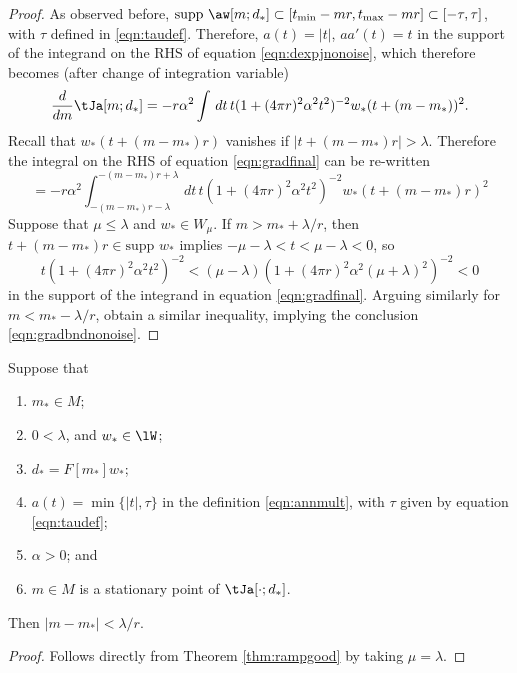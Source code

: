 \begin{proof}
  As observed before, $\mbox{supp }\aw[m;d_*] \subset [t_{\rm
    min}-mr,t_{\rm max}-mr]\subset [-\tau,\tau]$, with $\tau$ defined
  in \ref{eqn:taudef}. Therefore, $a(t) = |t|$, $a a'(t) = t$ in the
  support of the integrand on the RHS of equation
  \ref{eqn:dexpjnonoise}, which therefore 
  becomes (after change of integration variable)
  \begin{equation}
    \label{eqn:gradfinal}
    \frac{d}{dm}\tJa[m;d_*] = -r \alpha^2 \int \,dt \, 
  t(1+(4\pi r)^2 \alpha^2 
  t^2)^{-2}w_*(t+(m-m_*))^2.
  \end{equation}
  Recall that $w_*(t+(m-m_*)r)$
  vanishes if $|t+(m-m_*)r| > \lambda$. Therefore the integral on the
  RHS of equation \ref{eqn:gradfinal} can be re-written
  \[
    = -r\alpha^2\int_{-(m-m_*)r-\lambda}^{-(m-m_*)r+\lambda}
    \,dt\, t(1+(4\pi r)^2\alpha^2 t^2)^{-2}w_*\left(t+(m-m_*)r\right)^2
  \]
  Suppose that $\mu \le \lambda$ and $w_* \in W_{\mu}$. 
  If $m > m_*+\lambda/r$, then $t+(m-m_*)r \in \mbox{supp }w_*$
  implies $-\mu - \lambda < t < \mu-\lambda<0$, so 
  \[
    t(1+(4\pi r)^2\alpha^2 t^2)^{-2} < (\mu-\lambda)(1+(4\pi r)^2\alpha^2 (\mu+\lambda)^2)^{-2}<0
  \]
  in the support of the integrand in equation
  \ref{eqn:gradfinal}. Arguing similarly for $m<m_*-\lambda/r$, obtain
  a similar inequality, implying the conclusion \ref{eqn:gradbndnonoise}.
\end{proof}

\begin{corollary}
  \label{thm:rampreallygood}
  Suppose that
  \begin{enumerate}
  \item $m_* \in M$;
  \item $0 <  \lambda$, and $w_* \in \lW$;
  \item $d_* = F[m_*]w_*$;
  \item $a(t)=\min\{|t|,\tau\}$ in the definition \ref{eqn:annmult},
    with $\tau$ given by equation \ref{eqn:taudef}; 
  \item $\alpha > 0$; and
  \item$m \in M$ is a stationary point of $\tJa[\cdot;d_*]$.
  \end{enumerate}
  Then $|m-m_*| < \lambda /r$.
\end{corollary}

\begin{proof} Follows directly from Theorem \ref{thm:rampgood} by
  taking $\mu=\lambda$.
\end{proof}

